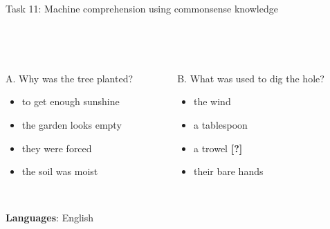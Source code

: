 \documentclass[10pt, compress]{beamer}
\begin{document}
\begin{frame}{Task 11: Machine comprehension using commonsense knowledge}
 

~\\
~\\

\begin{columns}
  \begin{column}{0.5\textwidth}
   \alert<2>{A. Why was the tree planted?}
      \begin{itemize}
      \item    to get enough sunshine
      \item    \alert<2>{the garden looks empty}
      \item    they were forced
      \item    the soil was moist
      \end{itemize}
  \end{column}
  \begin{column}{0.5\textwidth}
   \alert<3>{B. What was used to dig the hole?}
      \begin{itemize}
      \item    the wind
      \item    a tablespoon
      \item    \alert<3>{a trowel} \textbf{[?]}
      \item    their bare hands
      \end{itemize}
  \end{column}
\end{columns}

~\\

\textbf{Languages}: English

\end{frame}
\end{document}
